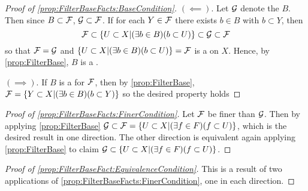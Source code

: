 \begin{prop}[FilterBaseFacts]
   \begin{proof}[Proof of \ref{prop:FilterBaseFacts:BaseCondition}]
    $(\impliedby)$. Let $\mathcal{G}$ denote the \Filter \FilterGeneratedBy $B$. 
    Then since $B \subset \mathcal{F}$, $\mathcal{G} \subset \mathcal{F}$. 
    If for each $Y \in \mathcal{F}$ there exists $b \in B$ with $b \subset Y$, then 
    \begin{equation}
    \mathcal{F} \subset \{U \subset X | (\exists b \in B) (b \subset U) \} \subset \mathcal{G} \subset \mathcal{F}
    \end{equation}
    so that $\mathcal{F} = \mathcal{G}$ and 
    $\{U \subset X | (\exists b \in B) (b \subset U)\}= \mathcal{F}$ is a \Filter on $X$. 
    Hence, by  \ref{prop:FilterBase}, $B$ is a \Filter. 

    $(\implies)$. If $B$ is a \FilterBase for $\mathcal{F}$, then by 
    \ref{prop:FilterBase}, $\mathcal{F}= \{Y \subset X | (\exists b \in B) ( b \subset Y) \}$
    so the desired property holds
   \end{proof}
   \begin{proof}[Proof of \ref{prop:FilterBaseFacts:FinerCondition}]
   Let $\mathcal{F}$ be finer than $\mathcal{G}$. Then 
   by applying \ref{prop:FilterBase}
   $\mathcal{G} \subset \mathcal{F} = \{ U \subset X | (\exists f \in F) (f \subset U) \}$, which is the desired result in one direction. 
   The other direction is equivalent again applying \ref{prop:FilterBase}
   to claim
   $\mathcal{G} \subset \{U \subset X | (\exists f \in F) ( f \subset U ) \}$.
   \end{proof}
   \begin{proof}[Proof of \ref{prop:FilterBaseFact:EquivalenceCondition}]
   This is a result of two applications of \ref{prop:FilterBaseFacts:FinerCondition}, 
   one in each direction. 
   \end{proof}
\end{prop}
